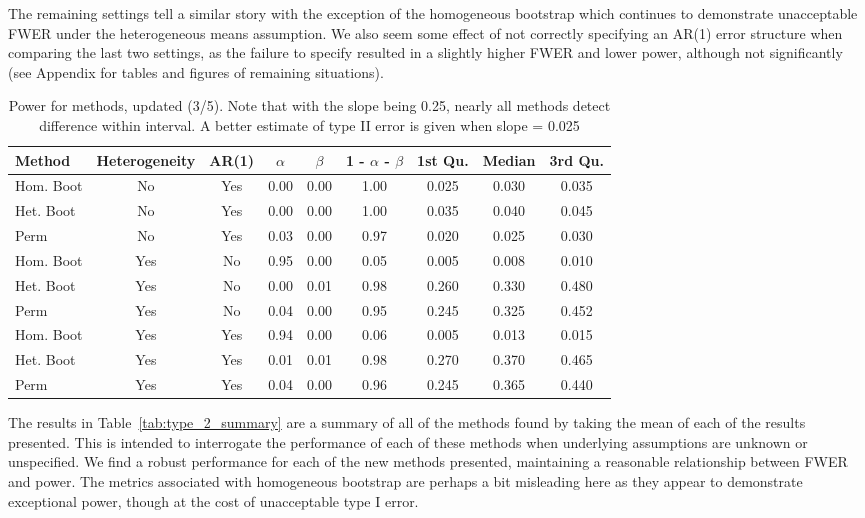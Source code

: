 \documentclass{article}
\begin{document}
The remaining settings tell a similar story with the exception of the homogeneous bootstrap which continues to demonstrate unacceptable FWER under the heterogeneous means assumption. We also seem some effect of not correctly specifying an AR(1) error structure when comparing the last two settings, as the failure to specify resulted in a slightly higher FWER and lower power, although not significantly (see Appendix for tables and figures of remaining situations). 


\begin{table}[H]
\centering
\begin{tabular}{lcccccccc}
  \hline
Method & Heterogeneity & AR(1) & $\alpha$ & $\beta$ & 1 - $\alpha$ - $\beta$ & 1st Qu. & Median & 3rd Qu. \\ 
  \hline
Hom. Boot & No & Yes & 0.00 & 0.00 & 1.00 & 0.025 & 0.030 & 0.035 \\ 
  Het. Boot & No & Yes & 0.00 & 0.00 & 1.00 & 0.035 & 0.040 & 0.045 \\ 
  Perm & No & Yes & 0.03 & 0.00 & 0.97 & 0.020 & 0.025 & 0.030 \\
  \hline
  Hom. Boot & Yes & No & 0.95 & 0.00 & 0.05 & 0.005 & 0.008 & 0.010 \\ 
  Het. Boot & Yes & No & 0.00 & 0.01 & 0.98 & 0.260 & 0.330 & 0.480 \\ 
  Perm & Yes & No & 0.04 & 0.00 & 0.95 & 0.245 & 0.325 & 0.452 \\
  \hline
  Hom. Boot & Yes & Yes & 0.94 & 0.00 & 0.06 & 0.005 & 0.013 & 0.015 \\ 
  Het. Boot & Yes & Yes & 0.01 & 0.01 & 0.98 & 0.270 & 0.370 & 0.465 \\ 
  Perm & Yes & Yes & 0.04 & 0.00 & 0.96 & 0.245 & 0.365 & 0.440 \\ 
   \hline
\end{tabular}
\caption{Power for methods, updated (3/5). Note that with the slope being 0.25, nearly all methods detect difference within interval. A better estimate of type II error is given when slope = 0.025 } 
\label{tab:power_methods}
\end{table}

The results in Table~\ref{tab:type_2_summary} are a summary of all of the methods found by taking the mean of each of the results presented. This is intended to interrogate the performance of each of these methods when underlying assumptions are unknown or unspecified. We find a robust performance for each of the new methods presented, maintaining a reasonable relationship between FWER and power. The metrics associated with homogeneous bootstrap are perhaps a bit misleading here as they appear to demonstrate exceptional power, though at the cost of unacceptable type I error.
\end{document}
